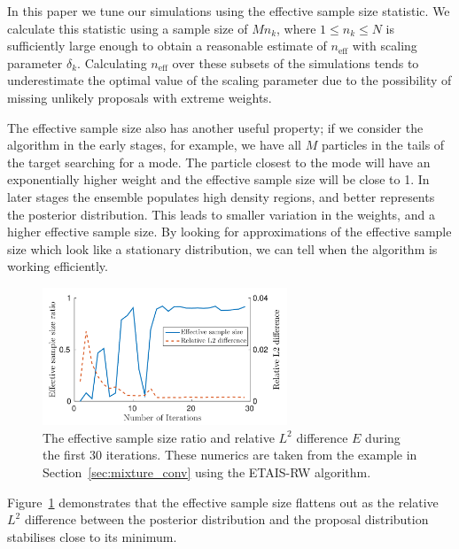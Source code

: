 \documentclass[final]{siamltex}
\newcommand{\neff}{n_{\text{eff}}}
\begin{document}
In this paper we tune our simulations using the effective sample size
statistic. We calculate this statistic using a sample size of $Mn_k$,
where $1 \leq n_k\leq N$ is sufficiently large enough to obtain a
reasonable estimate of $\neff$ with scaling parameter $\delta_k$.
Calculating $\neff$ over these subsets of the simulations tends to
underestimate the optimal value of the scaling parameter due to the
possibility of missing unlikely proposals with extreme weights.

The effective sample size also has another useful property; if we
consider the algorithm in the early stages, for example, we have all
$M$ particles in the tails of the target searching for a mode. The
particle closest to the mode will have an exponentially higher weight
and the effective sample size will be close to 1. In later stages the
ensemble populates high density regions, and better represents the
posterior distribution. This leads to smaller variation in the
weights, and a higher effective sample size. By looking for
approximations of the effective sample size which look like a
stationary distribution, we can tell when the algorithm is working
efficiently.

\begin{figure}[htb]
\centering
\includegraphics[width=0.65\textwidth]{"figures/C1_burnin"}
\caption{The effective sample size ratio and relative $L^2$ difference
$E$ during the first 30 iterations. These numerics are taken from the
example in Section~\ref{sec:mixture_conv} using the ETAIS-RW algorithm.}
\label{fig:neff-burnin}
\end{figure}

Figure~\ref{fig:neff-burnin} demonstrates that the effective sample
size flattens out as the relative $L^2$ difference between the
posterior distribution and the proposal distribution stabilises close
to its minimum.
\end{document}
